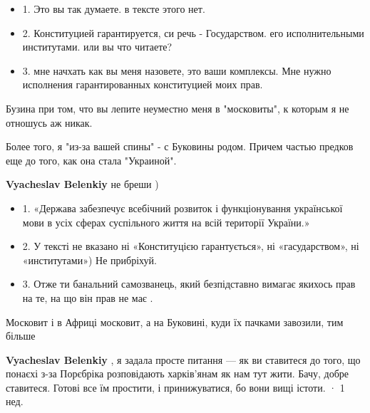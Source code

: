 \begin{itemize}
\begin{itemize}
\begin{itemize}
  \item 1. Это вы так думаете. в тексте этого нет.
  \item 2. Конституцией гарантируется, си речь - Государством. его исполнительными институтами. или вы что читаете?
  \item 3. мне начхать как вы меня назовете, это ваши комплексы. Мне нужно исполнения гарантированных конституцией моих прав.
\end{itemize}

Бузина при том, что вы лепите неуместно меня в "московиты", к которым я не
отношусь аж никак.

Более того, я "из-за вашей спины" - с Буковины родом. Причем частью предков еще
до того, как она стала "Украиной".

 
\textbf{Vyacheslav Belenkiy} не бреши )

\begin{itemize}
  \item 1. «Держава забезпечує всебічний розвиток і функціонування української мови в усіх сферах суспільного життя на всій території України.»
  \item 2. У тексті не вказано ні «Конституцією гарантується», ні «гасударством», ні «институтами») Не прибріхуй.
  \item 3. Отже ти банальний самозванець, який безпідставно вимагає якихось прав на те, на що він прав не має .
\end{itemize}


Московит і в Африці московит, а на Буковині, куди їх пачками завозили, тим більше

 
\textbf{Vyacheslav Belenkiy} , я задала просте питання — як ви ставитеся до
того, що понаєхі з-за Порєбріка розповідають харків'янам як нам тут жити. Бачу,
добре ставитеся. Готові все їм простити, і принижуватися, бо вони вищі істоти.
· 1 нед.
 

\end{itemize}
\end{itemize}

